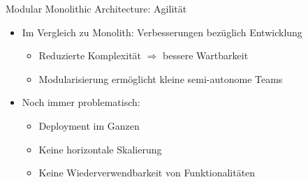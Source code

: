 \begin{frame}{Modular Monolithic Architecture: Agilität}
    \begin{itemize}
        \item Im Vergleich zu Monolith: Verbesserungen bezüglich Entwicklung
        \begin{itemize}
            \item Reduzierte Komplexität $\Rightarrow$ bessere Wartbarkeit
            \item Modularisierung ermöglicht kleine semi-autonome Teams
        \end{itemize}
        \item Noch immer problematisch:
        \begin{itemize}
            \item Deployment im Ganzen
            \item Keine horizontale Skalierung
            \item Keine Wiederverwendbarkeit von Funktionalitäten
        \end{itemize}
    \end{itemize}
\end{frame}